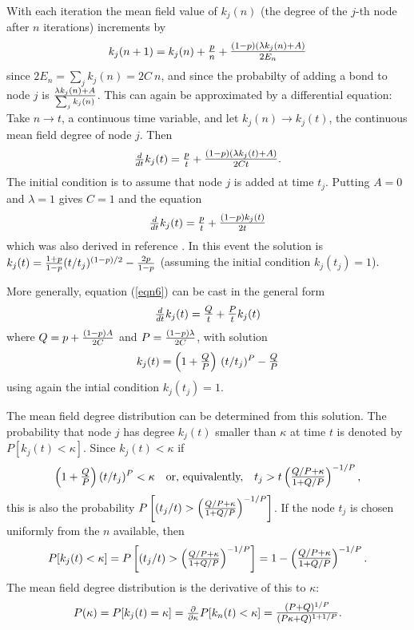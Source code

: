 \documentclass[12pt]{iopart}
\def\sfrac#1#2{\hbox{\normalsize $\frac{#1}{#2}$}}
\def\Sfrac#1#2{\hbox{\large$\frac{#1}{#2}$}}
\def\Ref#1{(\ref{#1})}
\def\thin{\:\!}
\begin{document}
With each iteration the mean field value of $k_j(n)$ (the degree of the $j$-th node
after $n$ iterations) increments by
\begin{equation}
k_j(n+1) = k_j(n) + \Sfrac{p}{n} + \Sfrac{(1-p)(\lambda k_j(n) + A)}{2E_n} 
\end{equation}
since $2E_n = \sum_j k_j(n)=2C\thin n$, and since the probabilty of adding a bond to
node $j$ is $\sfrac{\lambda k_j(n)+A}{\sum_j k_j(n)}$.
This can again be approximated by a differential equation:  Take $n\to t$, a continuous
time variable, and let $k_j(n) \to k_j(t)$, the continuous mean field degree of node $j$.
Then
\begin{equation}
\sfrac{d}{dt} k_j(t) = \Sfrac{p}{t} + \Sfrac{(1-p)(\lambda k_j(t) + A)}{2Ct}.
\label{eqn6}  %
\end{equation}
The initial condition is to assume that node $j$ is added at time $t_j$.
Putting $A=0$ and $\lambda=1$ gives $C=1$ and the equation
\begin{equation}
\sfrac{d}{dt} k_j(t) = \Sfrac{p}{t} + \Sfrac{(1-p)k_j(t)}{2t}
\end{equation}
which was also derived in reference \cite{BAJ99}.  In this event the solution is 
$k_j(t) = \sfrac{1+p}{1-p} (t/t_j)^{(1-p)/2}-\sfrac{2p}{1-p}$ (assuming the initial
condition $k_j(t_j)=1$).

More generally, equation \Ref{eqn6} can be cast in the general form
\begin{equation}
\sfrac{d}{dt} k_j(t) = \Sfrac{Q}{t} + \Sfrac{P}{t} k_j(t)
\end{equation}
where $Q= p + \sfrac{(1-p)A}{2C}$ and $P=\sfrac{(1-p)\lambda}{2C}$, with solution
\begin{equation}
k_j(t) = \left(1+\Sfrac{Q}{P}\right)\,(t/t_j)^P - \Sfrac{Q}{P}
\label{eqn12}   %
\end{equation}
using again the intial condition $k_j(t_j)=1$.

The mean field degree distribution can be determined from this solution.  The probability
that node $j$ has degree $k_j(t)$ smaller than $\kappa$ at time $t$ is denoted by
$P[k_j(t) < \kappa]$.  Since $k_j(t) < \kappa$ if 
\[ \left(1+\Sfrac{Q}{P}\right)(t/t_j)^P < \kappa
\quad\hbox{or, equivalently,}\quad
t_j > t \left( \Sfrac{Q/P + \kappa}{1+Q/P} \right)^{-1/P} , \]
this is also the probability $P\left[(t_j/t) > \left( \sfrac{Q/P + \kappa}{1+Q/P} \right)^{-1/P}\right]$.
If the node $t_j$ is chosen uniformly from the $n$ available, then 
\begin{equation}
P[k_j(t) < \kappa] = P\left[(t_j/t) > \left( \sfrac{Q/P + \kappa}{1+Q/P} \right)^{-1/P}\right]
 = 1 -  \left( \Sfrac{Q/P + \kappa}{1+Q/P} \right)^{-1/P} .
\end{equation}
The mean field degree distribution is the derivative of this to $\kappa$:
\begin{equation}
P(\kappa) = P[k_j(t) = \kappa] = 
\sfrac{\partial}{\partial \kappa} P[k_n(t) < \kappa]
= \Sfrac{(P+Q)^{1/P}}{(P\kappa+Q)^{1+1/P}} .
\label{eqn11}  %
\end{equation}
\end{document}

